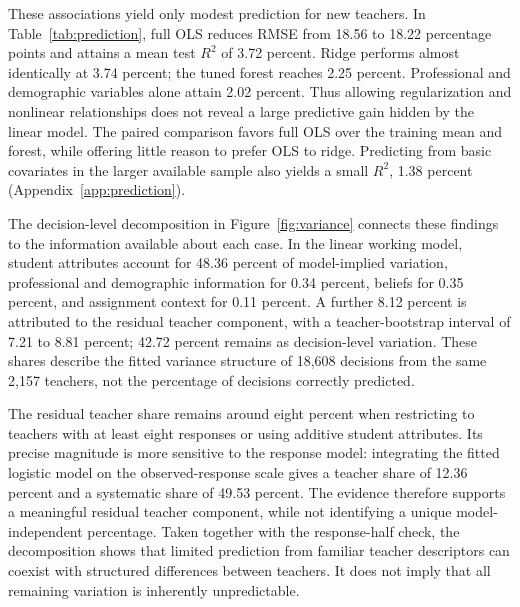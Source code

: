 These associations yield only modest prediction for new teachers. In Table~\ref{tab:prediction}, full OLS reduces RMSE from 18.56 to 18.22 percentage points and attains a mean test $R^2$ of 3.72 percent. Ridge performs almost identically at 3.74 percent; the tuned forest reaches 2.25 percent. Professional and demographic variables alone attain 2.02 percent. Thus allowing regularization and nonlinear relationships does not reveal a large predictive gain hidden by the linear model. The paired comparison favors full OLS over the training mean and forest, while offering little reason to prefer OLS to ridge. Predicting from basic covariates in the larger available sample also yields a small $R^2$, 1.38 percent (Appendix~\ref{app:prediction}).

\begin{addition}
The decision-level decomposition in Figure~\ref{fig:variance} connects these findings to the information available about each case. In the linear working model, student attributes account for 48.36 percent of model-implied variation, professional and demographic information for 0.34 percent, beliefs for 0.35 percent, and assignment context for 0.11 percent. A further 8.12 percent is attributed to the residual teacher component, with a teacher-bootstrap interval of 7.21 to 8.81 percent; 42.72 percent remains as decision-level variation. These shares describe the fitted variance structure of 18,608 decisions from the same 2,157 teachers, not the percentage of decisions correctly predicted.
\end{addition}
\begin{addition}
The residual teacher share remains around eight percent when restricting to teachers with at least eight responses or using additive student attributes. Its precise magnitude is more sensitive to the response model: integrating the fitted logistic model on the observed-response scale gives a teacher share of 12.36 percent and a systematic share of 49.53 percent. The evidence therefore supports a meaningful residual teacher component, while not identifying a unique model-independent percentage. Taken together with the response-half check, the decomposition shows that limited prediction from familiar teacher descriptors can coexist with structured differences between teachers. It does not imply that all remaining variation is inherently unpredictable.
\end{addition}

